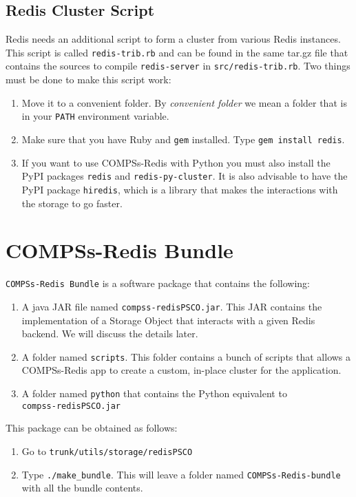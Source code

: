 \documentclass{article}
\begin{document}
\subsection{Redis Cluster Script}
Redis needs an additional script to form a cluster from various Redis instances. This script is called \verb|redis-trib.rb| and can be found in the same tar.gz file that contains the sources to compile \verb|redis-server| in \verb|src/redis-trib.rb|. Two things must be done to make this script work:
\begin{enumerate}
\item Move it to a convenient folder. By \textit{convenient folder} we mean a folder that is in your \verb|PATH| environment variable.
\item Make sure that you have Ruby and \verb|gem| installed. Type \verb|gem install redis|.
\item If you want to use COMPSs-Redis with Python you must also install the PyPI packages \verb|redis| and \verb|redis-py-cluster|. It is also advisable to have the PyPI package \verb|hiredis|, which is a library that makes the interactions with the storage to go faster.
\end{enumerate}

\section{COMPSs-Redis Bundle}
\verb|COMPSs-Redis Bundle| is a software package that contains the following:
\begin{enumerate}
\item A java JAR file named \verb|compss-redisPSCO.jar|. This JAR contains the implementation of a Storage Object that interacts with a given Redis backend. We will discuss the details later.
\item A folder named \verb|scripts|. This folder contains a bunch of scripts that allows a COMPSs-Redis app to create a custom, in-place cluster  for the application.
\item A folder named \verb|python| that contains the Python equivalent to \\ \verb|compss-redisPSCO.jar|
\end{enumerate}
This package can be obtained as follows:
\begin{enumerate}
\item Go to \verb|trunk/utils/storage/redisPSCO|
\item Type \verb|./make_bundle|. This will leave a folder named \verb|COMPSs-Redis-bundle| with all the bundle contents.
\end{enumerate}
\end{document}
